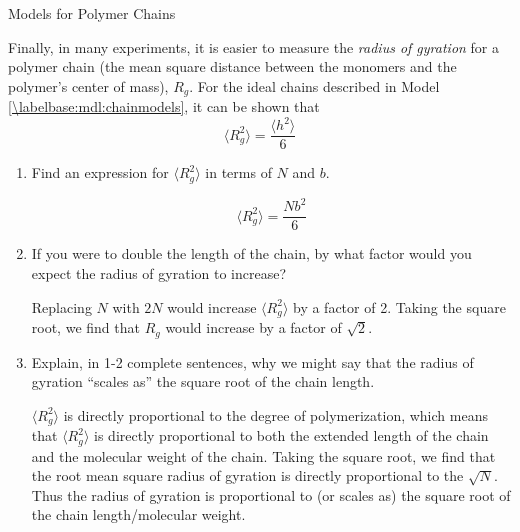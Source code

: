 \begin{activity}{Models for Polymer Chains}
\begin{ctqs}
		\begin{solution}[1.25in]\studentdisplay{}
		\end{solution}
	
	\question Finally, in many experiments, it is easier to measure the \emph{radius of gyration} for a polymer chain (the mean square distance between the monomers and the polymer's center of mass), $R_g$.  For the ideal chains described in Model \ref{\labelbase:mdl:chainmodels}, it can be shown that
		\begin{equation*}
			\langle R_g^2\rangle = \frac{\langle h^2\rangle}{6}
		\end{equation*}
		
		\begin{enumerate}
			\item Find an expression for $\langle R_g^2 \rangle$ in terms of $N$ and $b$.
	
		\begin{solution}[0.75in]
			\begin{equation*}
				\langle R_g^2 \rangle = \frac{Nb^2}{6}
			\end{equation*}
		\end{solution}
			
			\item If you were to double the length of the chain, by what factor would you expect the radius of gyration to increase?
	
		\begin{solution}[0.75in]
			Replacing $N$ with $2N$ would increase $\langle R_g^2 \rangle$ by a factor of 2. Taking the square root, we find that $R_g$ would increase by a factor of $\sqrt{2}$.
		\end{solution}
			
			\item Explain, in 1-2 complete sentences, why we might say that the radius of gyration ``scales as'' the square root of the chain length.
	
		\begin{solution}[1.5in]
			$\langle R_g^2 \rangle$ is directly proportional to the degree of polymerization, which means that $\langle R_g^2 \rangle$ is directly proportional to both the extended length of the chain and the molecular weight of the chain.  Taking the square root, we find that the root mean square radius of gyration is directly proportional to the $\sqrt{N}$.  Thus the radius of gyration is proportional to (or scales as) the square root of the chain length/molecular weight.
		\end{solution}
		\end{enumerate}
	

\end{ctqs}
\end{activity}
